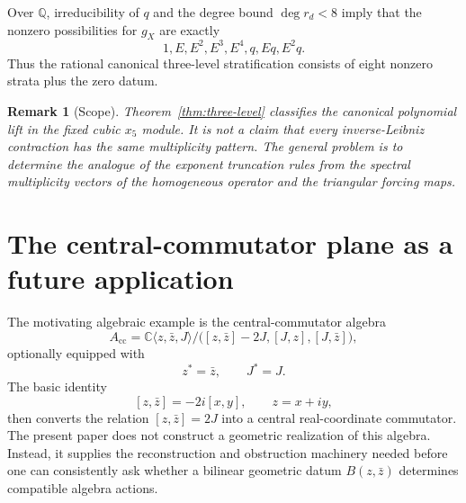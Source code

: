 \documentclass[11pt]{amsart}
\newtheorem{remark}[theorem]{Remark}
\newcommand{\C}{\mathbb C}
\newcommand{\Q}{\mathbb Q}
\begin{document}
Over $\Q$, irreducibility of $q$ and the degree bound $\deg r_d<8$ imply that the nonzero possibilities for $g_X$ are exactly
\[
1,
E,
E^2,
E^3,
E^4,
q,
Eq,
E^2q.
\]
Thus the rational canonical three-level stratification consists of eight nonzero strata plus the zero datum.

\begin{remark}[Scope]\label{rem:strat-scope}
Theorem~\ref{thm:three-level} classifies the canonical polynomial lift in the fixed cubic $x_5$ module.  It is not a claim that every inverse-Leibniz contraction has the same multiplicity pattern.  The general problem is to determine the analogue of the exponent truncation rules from the spectral multiplicity vectors of the homogeneous operator and the triangular forcing maps.
\end{remark}

\section{The central-commutator plane as a future application}

The motivating algebraic example is the central-commutator algebra
\[
A_{\mathrm{cc}}
=
\C\langle z,\bar z,J\rangle
\Big/
\bigl([z,\bar z]-2J,[J,z],[J,\bar z]\bigr),
\]
optionally equipped with
\[
z^*=\bar z,
\qquad
J^*=J.
\]
The basic identity
\[
[z,\bar z]=-2i[x,y],
\qquad
z=x+iy,
\]
then converts the relation $[z,\bar z]=2J$ into a central real-coordinate commutator.  The present paper does not construct a geometric realization of this algebra.  Instead, it supplies the reconstruction and obstruction machinery needed before one can consistently ask whether a bilinear geometric datum $B(z,\bar z)$ determines compatible algebra actions.
\end{document}
